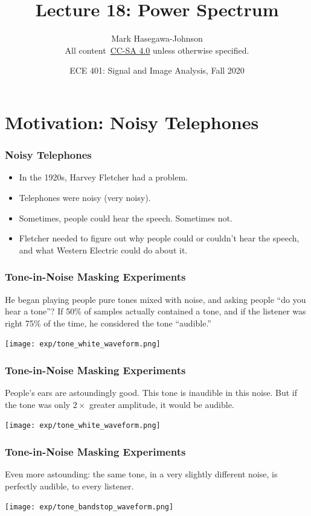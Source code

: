 \documentclass{beamer}
\title{Lecture 18: Power Spectrum}
\author{Mark Hasegawa-Johnson\\All content~\href{https://creativecommons.org/licenses/by-sa/4.0/}{CC-SA 4.0} unless otherwise specified.}
\date{ECE 401: Signal and Image Analysis, Fall 2020}
\begin{document}
\begin{frame}
  \maketitle
\end{frame}

\begin{frame}
  \tableofcontents
\end{frame}

\section[Motivation]{Motivation: Noisy Telephones}
\setcounter{subsection}{1}

\begin{frame}
  \frametitle{Noisy Telephones}
  \begin{itemize}
  \item In the 1920s, Harvey Fletcher had a problem.
  \item Telephones were noisy (very noisy).
  \item Sometimes, people could hear the speech.  Sometimes not.
  \item Fletcher needed to figure out why people could or couldn't hear the
    speech, and what Western Electric could do about  it.
  \end{itemize}
\end{frame}

\begin{frame}
  \frametitle{Tone-in-Noise Masking Experiments}

  He began playing people pure tones mixed with noise, and asking
  people ``do you hear a tone''?  If 50\% of samples actually
  contained a tone, and if the listener was right 75\% of the time, he
  considered the tone ``audible.''
  \centerline{\texttt{[image: exp/tone\_white\_waveform.png]}}
\end{frame}

\begin{frame}
  \frametitle{Tone-in-Noise Masking Experiments}

  People's ears are astoundingly good.  This tone is inaudible in this
  noise.  But if the tone was only $2\times$ greater amplitude, it
  would be audible.
  \centerline{\texttt{[image: exp/tone\_white\_waveform.png]}}
\end{frame}

\begin{frame}
  \frametitle{Tone-in-Noise Masking Experiments}

  Even more astounding: the same tone, in a very slightly different noise,
  is perfectly audible, to every listener.
  \centerline{\texttt{[image: exp/tone\_bandstop\_waveform.png]}}
\end{frame}
\end{document}

